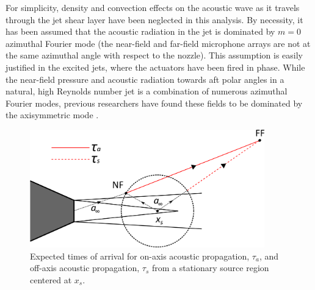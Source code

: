 For simplicity, density and convection effects on the acoustic wave as it travels through the jet shear layer have been neglected in this analysis. 
By necessity, it has been assumed that the acoustic radiation in the jet is dominated by $m = 0$ azimuthal Fourier mode (the near-field and far-field microphone arrays are not at the same azimuthal angle with respect to the nozzle). 
This assumption is easily justified in the excited jets, where the actuators have been fired in phase. 
While the near-field pressure and acoustic radiation towards aft polar angles in a natural, high Reynolds number jet is a combination of numerous azimuthal Fourier modes, previous researchers have found these fields to be dominated by the axisymmetric mode \citep{Arndt1997,Hall2006,Koenig2013,Juve1979}.
\begin{figure}
	\centering
	\includegraphics[width=4in]{Figures/ToA_tau.png}
	\caption{Expected times of arrival for on-axis acoustic propagation, $\tau_a$, and off-axis acoustic propagation, $\tau_s$ from a stationary source region centered at $x_s$.}
	\label{fig:ch3_ToA}
\end{figure}

